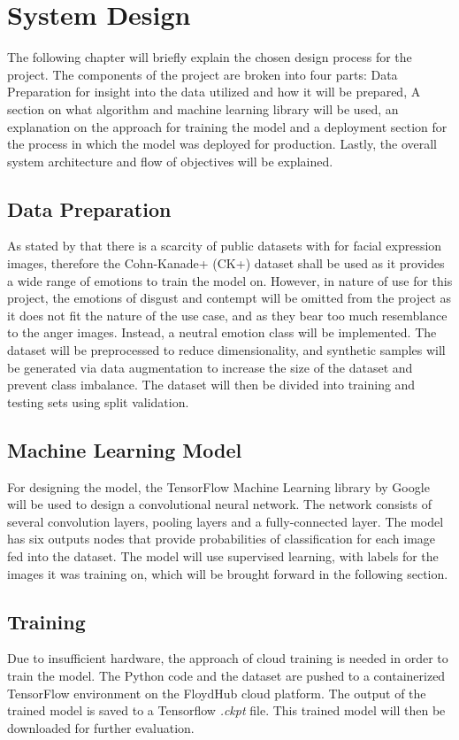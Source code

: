 \chapter{System Design}
The following chapter will briefly explain the chosen design process for the project. The components of the project are broken into four parts: Data Preparation for insight into the data utilized and how it will be prepared, A section on what algorithm and machine learning library will be used, an explanation on the approach for training the model and a deployment section for the process in which the model was deployed for production. Lastly, the overall system architecture and flow of objectives will be explained.

\section{Data Preparation}
As stated by \citeauthor*{LOPES} that there is a scarcity of public datasets with for facial expression images, therefore the Cohn-Kanade+ (CK+) dataset shall be used as it provides a wide range of emotions to train the model on. However, in nature of use for this project, the emotions of disgust and contempt will be omitted from the project as it does not fit the nature of the use case, and as they bear too much resemblance to the anger images. Instead, a neutral emotion class will be implemented.
The dataset will be preprocessed to reduce dimensionality, and synthetic samples will be generated via data augmentation to increase the size of the dataset and prevent class imbalance. The dataset will then be divided into training and testing sets using split validation. 

\section{Machine Learning Model}
For designing the model, the TensorFlow Machine Learning library by Google will be used to design a convolutional neural network. 
The network consists of several convolution layers, pooling layers and a fully-connected layer. The model has six outputs nodes that provide probabilities of classification for each image fed into the dataset. The model will use supervised learning, with labels for the images it was training on, which will be brought forward in the following section.\\

\section{Training}
Due to insufficient hardware, the approach of cloud training is needed in order to train the model. The Python code and the dataset are pushed to a containerized TensorFlow environment on the FloydHub cloud platform. The output of the trained model is saved to a Tensorflow \textit{.ckpt} file. This trained model will then be downloaded for further evaluation.

